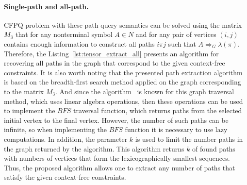 \paragraph{Single-path and all-path.} %
CFPQ problem with these path query semantics can be solved using the matrix $M_3$ that for any nonterminal symbol $A \in N$ and for any pair of vertices $(i, j)$ contains enough information to construct all paths $i \pi j$ such that $A \Rightarrow_G \lambda(\pi)$. Therefore, the Listing~\ref{lst:tensor_extract_all} presents an algorithm for recovering all paths in the graph that correspond to the given context-free constraints. It is also worth noting that the presented path extraction algorithm is based on the breadth-first search method applied on the graph corresponding to the matrix $M_3$. And since the algorithm~\cite{kepner2011graph} is known for this graph traversal method, which uses linear algebra operations, then these operations can be used to implement the $BFS$ traversal function, which returns paths from the selected initial vertex to the final vertex. However, the number of such paths can be infinite, so when implementing the $BFS$ function it is necessary to use lazy computations. In addition, the parameter $k$ is used to limit the number paths in the graph returned by the algorithm. This algorithm returns $k$ of found paths with numbers of vertices that form the lexicographically smallest sequences. Thus, the proposed algorithm allows one to extract any number of paths that satisfy the given context-free constraints.

